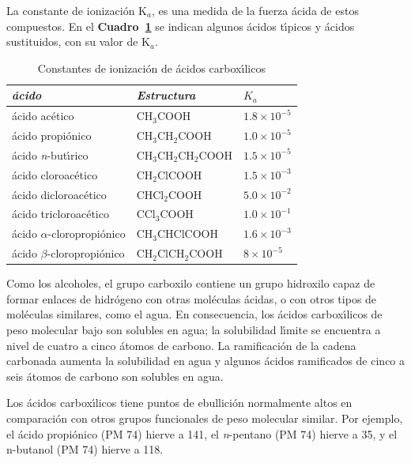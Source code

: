 La constante de ionizaci\'on K$_a$, es una medida de la fuerza \'acida de estos compuestos. En el \textbf{Cuadro~\ref{hcooh}} se indican algunos \'acidos t\'{\i}picos y \'acidos sustituidos, con su valor de K$_a$.
\begin{table}[hbt]
\caption{Constantes de ionizaci\'on de \'acidos carbox\'{\i}licos}
\label{hcooh}
\begin{center}
{\footnotesize \begin{tabular}{lll}\hline
\textit{\'acido} &\textit{Estructura}& $K_a$\\\hline
\'acido ac\'etico    &CH$_3$COOH              &$1.8\times10^{-5}$\\
\'acido propi\'onico &CH$_3$CH$_2$COOH        &$1.0\times10^{-5}$\\
\'acido \textit{n}-but\'{\i}rico&CH$_3$CH$_2$CH$_2$COOH 
&$1.5\times10^{-5}$\\
\'acido cloroac\'etico &CH$_2$ClCOOH  &$1.5\times10^{-3}$\\
\'acido dicloroac\'etico &CHCl$_2$COOH  &$5.0\times10^{-2}$\\
\'acido tricloroac\'etico &CCl$_3$COOH  &$1.0\times10^{-1}$\\
\'acido $\alpha$-cloropropi\'onico &CH$_3$CHClCOOH  &$1.6\times10^{-3}$\\
\'acido $\beta $-cloropropi\'onico &CH$_2$ClCH$_2$COOH 
&$8\times10^{-5}$\\[.05in]\hline
\end{tabular}
}
\end{center}
\end{table}
Como los alcoholes, el grupo  carboxilo contiene un grupo hidroxilo capaz de formar enlaces de hidr\'ogeno con otras mol\'eculas \'acidas, o con  otros tipos de mol\'eculas similares, como el agua. En consecuencia, los \'acidos carbox\'{\i}licos de peso molecular bajo son solubles en agua; la solubilidad l\'{\i}mite se encuentra a nivel de cuatro a cinco \'atomos de carbono. La ramificaci\'on de la cadena carbonada aumenta la solubilidad en agua y algunos \'acidos ramificados de cinco a seis \'atomos de carbono son solubles en agua.

Los \'acidos carbox\'{\i}licos tiene puntos de ebullici\'on normalmente altos en comparaci\'on con otros grupos funcionales de peso molecular similar. Por ejemplo, el \'acido propi\'onico (PM 74) hierve a 141\celsius, el \textit{n}-pentano (PM 74) hierve a 35\celsius, y el n-butanol (PM 74) hierve a 118\celsius. 

